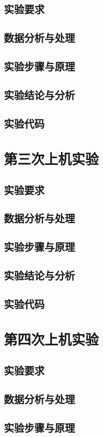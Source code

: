 \documentclass[a4paper,12pt]{report}
\begin{document}
\section{实验要求}
\section{数据分析与处理}
\section{实验步骤与原理}
\section{实验结论与分析}
\section{实验代码}
\clearpage
\chapter{第三次上机实验}
\section{实验要求}
\section{数据分析与处理}
\section{实验步骤与原理}
\section{实验结论与分析}
\section{实验代码}
\clearpage
\chapter{第四次上机实验}
\section{实验要求}
\section{数据分析与处理}
\section{实验步骤与原理}
\end{document}
